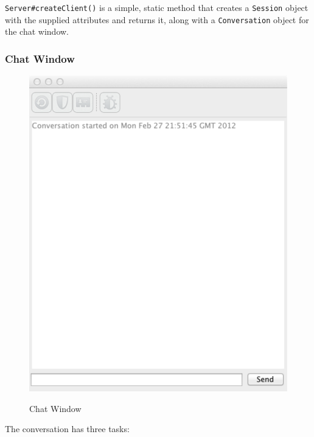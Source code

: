     \verb!Server#createClient()! is a simple, static method that creates a \verb!Session! object with the supplied attributes and returns it, along with a \verb!Conversation! object for the chat window.
  
    \subsubsection{Chat Window}
    \label{subsubsec:chat}
    
    \begin{figure}
      \centering
      \includegraphics[scale=0.7]{./Figures/Ch6/6-3-1-2-chat_window.pdf}
      \label{fig:chat_window}
      \caption{Chat Window}
     \end{figure}
    
    The conversation has three tasks:
    
